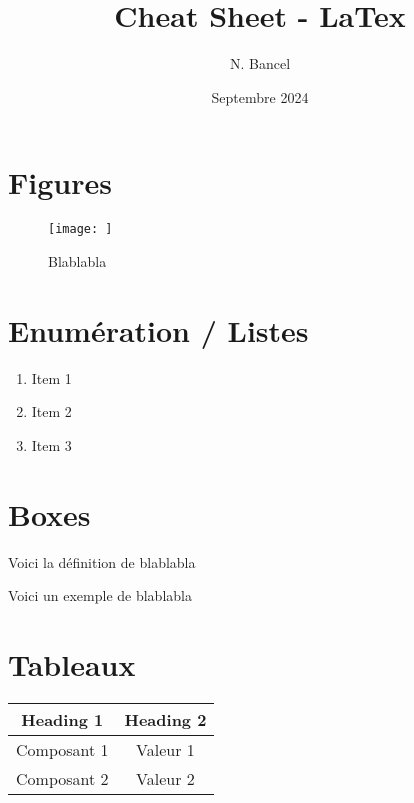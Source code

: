 \documentclass[a4paper,12pt]{article}
\begin{document}
\title{Cheat Sheet - LaTex}
\author{N. Bancel}
\date{Septembre 2024}
\maketitle

\section{Figures}

\begin{figure}[H]
  \centering
  \texttt{[image: ]}
  \caption{\label{} Blablabla}
\end{figure}

\section{Enumération / Listes}

\begin{enumerate}[noitemsep]
  \item Item 1
  \item Item 2
  \item Item 3
\end{enumerate}

\section{Boxes}

\begin{tcolorbox}[colback=green!10!white, colframe=green!75!black, title=Définition : xxx]
  Voici la définition de blablabla
\end{tcolorbox}

\begin{tcolorbox}[colback=blue!10!white, colframe=blue!75!black, title=Exemples - Application]
  Voici un exemple de blablabla
\end{tcolorbox}

\section{Tableaux}

\begin{tabular}{SS}
  \toprule
  {Heading 1} & {Heading 2} \\
  \midrule
  {Composant 1} & {Valeur 1} \\
  {Composant 2} & {Valeur 2} \\
  \bottomrule
\end{tabular}
\end{document}
